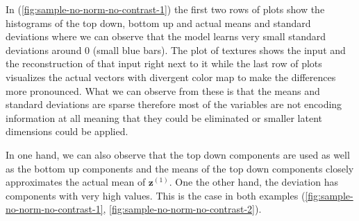 \documentclass[12pt, english]{article}
\begin{document}
\par In (\ref{fig:sample-no-norm-no-contrast-1}) the first two rows of plots show the histograms of the top down, bottom up and actual means and standard deviations where we can observe that the model learns very small standard deviations around 0 (small blue bars). The plot of textures shows the input and the reconstruction of that input right next to it while the last row of plots visualizes the actual vectors with divergent color map to make the differences more pronounced. What we can observe from these is that the means and standard deviations are sparse therefore most of the variables are not encoding information at all meaning that they could be eliminated or smaller latent dimensions could be applied.

\vspace{4mm}

\par In one hand, we can also observe that the top down components are used as well as the bottom up components and the means of the top down components closely approximates the actual mean of $\bm{z}^{(1)}$. One the other hand, the deviation has components with very high values. This is the case in both examples (\ref{fig:sample-no-norm-no-contrast-1}, \ref{fig:sample-no-norm-no-contrast-2}).

\vspace{4mm}
\end{document}
